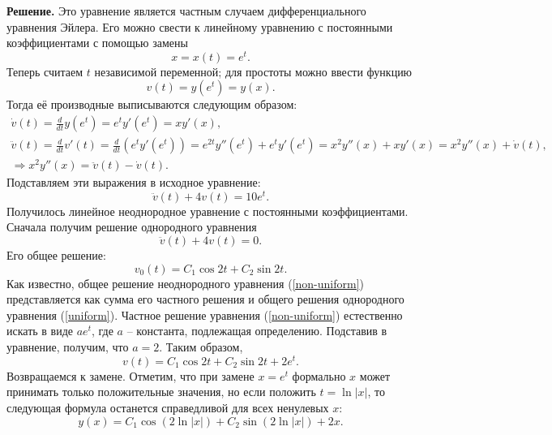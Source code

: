 \documentclass[12pt]{article}
\begin{document}
\noindent\textbf{Решение.} 
Это уравнение является частным случаем дифференциального уравнения Эйлера. Его можно свести к линейному уравнению с постоянными коэффициентами с помощью замены
\begin{equation*}
    x = x(t) = e^t.
\end{equation*}
Теперь считаем $t$ независимой переменной; для простоты можно ввести функцию
\begin{equation*}
    v(t) = y(e^t) = y(x).
\end{equation*}
Тогда её производные выписываются следующим образом:
\begin{gather*}
    \dot v(t) = \frac{d}{dt} y(e^t) = e^t y'(e^t) = xy'(x),\\
    \ddot v(t) = \frac{d}{dt} v'(t) = \frac{d}{dt} \left(e^t y'(e^t)\right) = e^{2t}y''(e^t) + e^t y'(e^t) = x^2y''(x)+xy'(x) = x^2y''(x)+\dot v(t),\\
    \Rightarrow x^2y''(x) = \ddot v(t) - \dot v(t).
\end{gather*}
Подставляем эти выражения в исходное уравнение:
\begin{equation}\label{non-uniform}
    \ddot v(t) + 4v(t) = 10e^t.
\end{equation}
Получилось линейное неоднородное уравнение с постоянными коэффициентами. Сначала получим решение однородного уравнения
\begin{equation*}
    \ddot v(t) + 4v(t) = 0.
\end{equation*}
Его общее решение:
\begin{equation}\label{uniform}
    v_0(t) = C_1\cos{2t} + C_2\sin{2t}.
\end{equation}
Как известно, общее решение неоднородного уравнения (\ref{non-uniform}) представляется как сумма его частного решения и общего решения однородного уравнения (\ref{uniform}). Частное решение уравнения (\ref{non-uniform}) естественно искать в виде $ae^t$, где $a$ -- константа, подлежащая определению. Подставив в уравнение, получим, что $a = 2$. Таким образом,
\begin{equation*}
    v(t) = C_1\cos{2t} + C_2\sin{2t} + 2e^t.
\end{equation*}
Возвращаемся к замене. Отметим, что при замене $x=e^t$ формально $x$ может принимать только положительные значения, но если положить $t = \ln{|x|}$, то следующая формула останется справедливой для всех ненулевых $x$:
\begin{equation*}
    y(x) = C_1\cos{(2\ln{|x|})} + C_2\sin{(2\ln{|x|})} + 2x.
\end{equation*}
\end{document}

